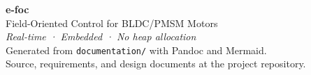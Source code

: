 \cleardoublepage
\thispagestyle{empty}
\vspace*{\fill}
\begin{center}
{\Large\bfseries\color{RoyalBlue} e-foc}\\[0.5em]
{\large Field-Oriented Control for BLDC/PMSM Motors}\\[2em]
{\itshape Real-time · Embedded · No heap allocation}\\[2em]
Generated from \texttt{documentation/} with Pandoc and Mermaid.\\[0.5em]
Source, requirements, and design documents at the project repository.
\end{center}
\vspace*{\fill}
